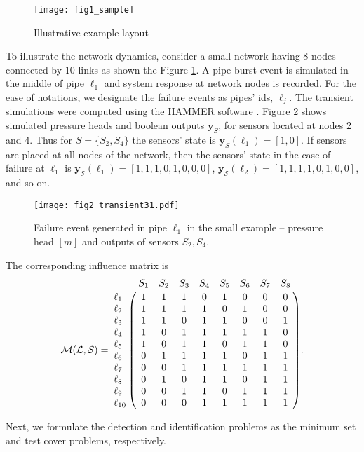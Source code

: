 \documentclass[twocolumn]{autart}
\begin{document}
\begin{exmp} \label{ex:1}
\begin{figure}[ht]
\centering
\texttt{[image: fig1\_sample]}
\caption{Illustrative example layout}
\label{fig:3}
\end{figure}
To illustrate the network dynamics, consider a small network having  $8$ nodes connected by $10$ links as shown the Figure \ref{fig:3}. A pipe burst event is simulated in the middle of pipe $\ell_1$ and system response at network nodes is recorded. For the ease of notations, we designate the failure events as pipes' ids, $\ell_j$. The transient simulations were computed using the HAMMER software \cite{Bentley}. 
Figure \ref{fig:4} shows simulated pressure heads and boolean outputs $\mathbf{y}_{S}$, for sensors located at nodes 2 and 4. 
Thus for $S = \{S_2,S_4\}$ the sensors' state is $\mathbf{y}_{S} (\ell_1)  = [1,0]$. If sensors are placed at all nodes of the network, then the sensors' state in the case of failure at $\ell_1$ is $\mathbf{y}_{\mathcal{S}} (\ell_1) = [1,1,1,0,1,0,0,0]$, $\mathbf{y}_{\mathcal{S}} (\ell_2) = [1,1,1,1,0,1,0,0]$, and so on. 
\begin{figure}
        \centering       
   \texttt{[image: fig2\_transient31.pdf]}
       \caption{Failure event generated in pipe $\ell_1$ in the small example -- pressure head $[m]$ and outputs of sensors $S_2,S_4$.}  \label{fig:4}
\end{figure}
The corresponding influence matrix is \vspace{-0.25cm}
\scriptsize
$$\mathcal{M}( \mathcal{L},\mathcal{S}) = 
\bordermatrix{
& S_1& S_2& S_3& S_4& S_5& S_6& S_7& S_8\cr
\ell_1&1 & 1 & 1 & 0 & 1 & 0 & 0 & 0 \cr 
\ell_2&1 & 1 & 1 & 1 & 0 & 1 & 0 & 0 \cr
\ell_3&1 & 1 & 0 & 1 & 1 & 0 & 0 & 1 \cr 
\ell_4&1 & 0 & 1 & 1 & 1 & 1 & 1 & 0 \cr
\ell_5&1 & 0 & 1 & 1 & 0 & 1 & 1 & 0 \cr
\ell_6&0 & 1 & 1 & 1 & 1 & 0 & 1 & 1 \cr 
\ell_7&0 & 0 & 1 & 1 & 1 & 1 & 1 & 1 \cr
\ell_8&0 & 1 & 0 & 1 & 1 & 0 & 1 & 1 \cr
\ell_9&0 & 0 & 1 & 1 & 0 & 1 & 1 & 1 \cr
\ell_{10}& 0 & 0 & 0 & 1 & 1 & 1 & 1 & 1}.
$$
\end{exmp} \vspace{-0.35cm}
Next, we formulate the detection and identification problems as the minimum set and test cover problems, respectively.
\end{document}
